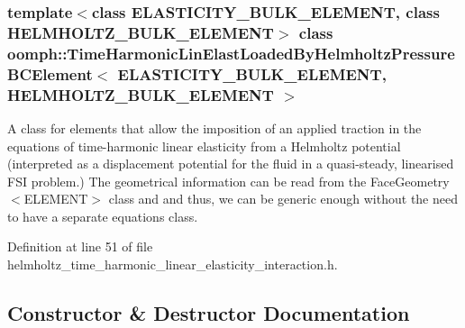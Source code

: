 \subsubsection*{template$<$class E\+L\+A\+S\+T\+I\+C\+I\+T\+Y\+\_\+\+B\+U\+L\+K\+\_\+\+E\+L\+E\+M\+E\+NT, class H\+E\+L\+M\+H\+O\+L\+T\+Z\+\_\+\+B\+U\+L\+K\+\_\+\+E\+L\+E\+M\+E\+NT$>$\newline
class oomph\+::\+Time\+Harmonic\+Lin\+Elast\+Loaded\+By\+Helmholtz\+Pressure\+B\+C\+Element$<$ E\+L\+A\+S\+T\+I\+C\+I\+T\+Y\+\_\+\+B\+U\+L\+K\+\_\+\+E\+L\+E\+M\+E\+N\+T, H\+E\+L\+M\+H\+O\+L\+T\+Z\+\_\+\+B\+U\+L\+K\+\_\+\+E\+L\+E\+M\+E\+N\+T $>$}

A class for elements that allow the imposition of an applied traction in the equations of time-\/harmonic linear elasticity from a Helmholtz potential (interpreted as a displacement potential for the fluid in a quasi-\/steady, linearised F\+SI problem.) The geometrical information can be read from the Face\+Geometry$<$\+E\+L\+E\+M\+E\+N\+T$>$ class and and thus, we can be generic enough without the need to have a separate equations class. 

Definition at line 51 of file helmholtz\+\_\+time\+\_\+harmonic\+\_\+linear\+\_\+elasticity\+\_\+interaction.\+h.



\subsection{Constructor \& Destructor Documentation}
\mbox{\label{classoomph_1_1TimeHarmonicLinElastLoadedByHelmholtzPressureBCElement_af0ac460cd2caeb9ba7c7b27e13d5ebc6}} 
